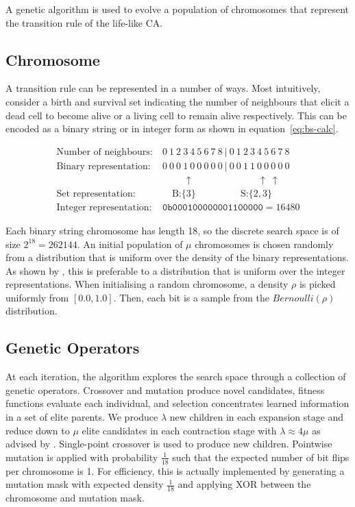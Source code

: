 A genetic algorithm is used to evolve a population of chromosomes that represent the transition rule of the life-like CA.

\subsection{Chromosome}
A transition rule can be represented in a number of ways. Most intuitively, consider a birth and survival set indicating the number of neighbours that elicit a dead cell to become alive or a living cell to remain alive respectively. This can be encoded as a binary string or in integer form as shown in equation~\ref{eq:bs-calc}.

\begin{equation} \label{eq:bs-calc}
\begin{split}
    \text{Number of neighbours:}&\ 0\ 1\ 2\ 3\ 4\ 5\ 6\ 7\ 8\ |\ 0\ 1\ 2\ 3\ 4\ 5\ 6\ 7\ 8\\
    \text{Binary representation:}&\ 0\ 0\ 0\ 1\ 0\ 0\ 0\ 0\ 0\ |\ 0\ 0\ 1\ 1\ 0\ 0\ 0\ 0\ 0\\
    &\qquad\ \: \uparrow \qquad \qquad \qquad \ \: \: \uparrow \ \uparrow\\
    \text{Set representation:}&\quad \ \text{B:} \{3\} \qquad \qquad \ \ \: \text{S:}\{2, 3\}\\
    \text{Integer representation:}&\ \texttt{0b000100000001100000} = 16480
\end{split}   
\end{equation}

Each binary string chromosome has length 18, so the discrete search space is of size $2^{18} = 262144$. An initial population of $\mu$ chromosomes is chosen randomly from a distribution that is uniform over the density of the binary representations. As shown by \cite{mitchell1994evolving}, this is preferable to a distribution that is uniform over the integer representations. When initialising a random chromosome, a density $\rho$ is picked uniformly from $[0.0, 1.0]$. Then, each bit is a sample from the $\mathit{Bernoulli}(\rho)$ distribution.\\

\subsection{Genetic Operators}
At each iteration, the algorithm explores the search space through a collection of genetic operators. Crossover and mutation produce novel candidates, fitness functions evaluate each individual, and selection concentrates learned information in a set of elite parents. We produce $\lambda$ new children in each expansion stage and reduce down to $\mu$ elite candidates in each contraction stage with $\lambda \approx 4\mu$ as advised by \cite{hansen2015evolution}. Single-point crossover is used to produce new children. Pointwise mutation is applied with probability $\frac{1}{18}$ such that the expected number of bit flips per chromosome is 1. For efficiency, this is actually implemented by generating a mutation mask with expected density $\frac{1}{18}$ and applying XOR between the chromosome and mutation mask.\\

